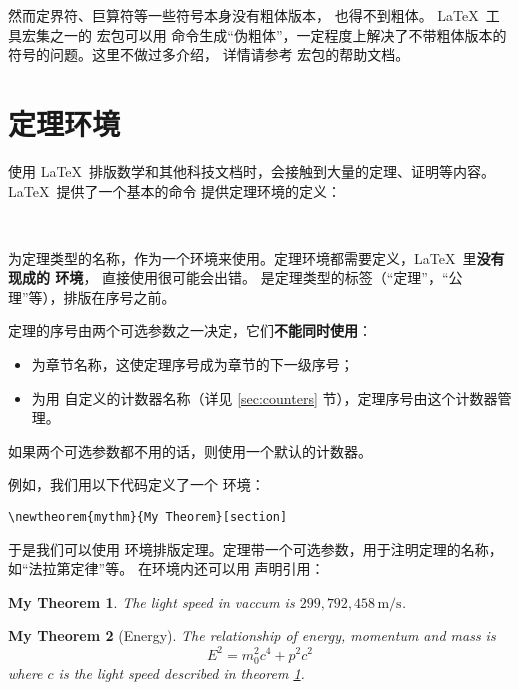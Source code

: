 然而定界符、巨算符等一些符号本身没有粗体版本， 也得不到粗体。
\LaTeX\ 工具宏集之一的  宏包可以用  命令生成“伪粗体”，一定程度上解决了不带粗体版本的符号的问题。这里不做过多介绍，
详情请参考  宏包的帮助文档。

\section{定理环境}\label{sec:theorems}

使用 \LaTeX\ 排版数学和其他科技文档时，会接触到大量的定理、证明等内容。
\LaTeX\ 提供了一个基本的命令  提供定理环境的定义：
\begin{command}
 \\
\end{command}

 为定理类型的名称，作为一个环境来使用。定理环境都需要定义，\LaTeX\ 里\textbf{没有现成的  环境}，
直接使用很可能会出错。 是定理类型的标签（“定理”，“公理”等），排版在序号之前。

定理的序号由两个可选参数之一决定，它们\textbf{不能同时使用}：
\begin{itemize}
  \item {} 为章节名称，这使定理序号成为章节的下一级序号；
  \item {} 为用  自定义的计数器名称（详见 \ref{sec:counters} 节），定理序号由这个计数器管理。
\end{itemize}

如果两个可选参数都不用的话，则使用一个默认的计数器。

例如，我们用以下代码定义了一个  环境：
\begin{verbatim}
\newtheorem{mythm}{My Theorem}[section]
\end{verbatim}

于是我们可以使用  环境排版定理。定理带一个可选参数，用于注明定理的名称，如“法拉第定律”等。
在环境内还可以用  声明引用：
\begin{example}
\newtheorem{mythm}{My Theorem}[section]
\begin{mythm}\label{thm:light}
The light speed in vaccum
is $299,792,458\,\mathrm{m/s}$.
\end{mythm}
\begin{mythm}[Energy]
The relationship of energy, 
momentum and mass is 
\[E^2 = m_0^2 c^4 + p^2 c^2\]
where $c$ is the light speed 
described in theorem \ref{thm:light}.
\end{mythm}
\end{example}

